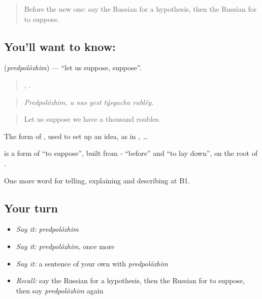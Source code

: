\label{lesson:RU-C371-predpolozhim}



\begin{quote}
Before the new one: say the Russian for a hypothesis, then the Russian for to suppose.
\end{quote}

\subsection*{You'll want to know: }
\textbf{} (\emph{predpolózhim}) — \textquotedblleft{}let us suppose, suppose\textquotedblright{}.

\begin{quote}
,     .
\end{quote}

\begin{quote}
\emph{Predpolózhim, u nas yest týsyacha rubléy.}
\end{quote}

\begin{quote}
Let us suppose we have a thousand roubles.
\end{quote}

The \emph{} form of \emph{}, used to set up an idea, as in \emph{, …}

\begin{cousinweb}
\textbf{} is a form of \emph{} \textquotedblleft{}to suppose\textquotedblright{}, built from \emph{-} \textquotedblleft{}before\textquotedblright{} and \emph{} \textquotedblleft{}to lay down\textquotedblright{}, on the root of \emph{}.
\end{cousinweb}

\begin{grammarlens}[title={What you've built}]
One more word for telling, explaining and describing at B1.
\end{grammarlens}

\subsection*{Your turn}
\begin{itemize}
\raggedright
  \item \emph{Say it:} \emph{predpolózhim}
  \item \emph{Say it:} \emph{predpolózhim}, once more
  \item \emph{Say it:} a sentence of your own with \emph{predpolózhim}
  \item \emph{Recall:} say the Russian for a hypothesis, then the Russian for to suppose, then say \emph{predpolózhim} again
\end{itemize}

